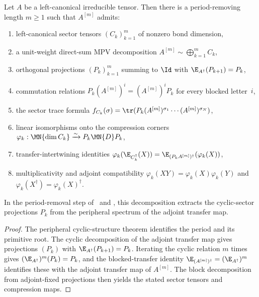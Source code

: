 \begin{lemma}%
    \label{thm:cyclic_sector_decomp_after_blocking}
    \leanok
    Let $A$ be a left-canonical irreducible tensor. Then there is a
    period-removing length $m\ge1$ such that $A^{[m]}$ admits:
    \begin{enumerate}
        \item left-canonical sector tensors $(C_k)_{k=1}^m$ of nonzero bond
              dimension,
        \item a unit-weight direct-sum MPV decomposition
              $A^{[m]}\sim\bigoplus_{k=1}^mC_k$,
        \item orthogonal projections $(P_k)_{k=1}^m$ summing to $\Id$ with
              $\E_{A^\dagger}(P_{k+1})=P_k$,
        \item commutation relations
              $P_k(A^{[m]})^i=(A^{[m]})^iP_k$ for every blocked letter~$i$,
        \item the sector trace formula
              $f_{C_k}(\sigma)
                  =\tr(P_k(A^{[m]})^{\sigma_1}\cdots(A^{[m]})^{\sigma_N})$,
        \item linear isomorphisms onto the compression corners
              $\varphi_k:\MN{\dim C_k}\xrightarrow{\sim}P_k\MN{D}P_k$,
        \item transfer-intertwining identities
              $\varphi_k(\E_{C_k^\dagger}(X))
                  =\E_{(P_kA^{[m]})^\dagger}(\varphi_k(X))$,
        \item multiplicativity and adjoint compatibility
              $\varphi_k(XY)=\varphi_k(X)\varphi_k(Y)$ and
              $\varphi_k(X^\dagger)=\varphi_k(X)^\dagger$.
    \end{enumerate}
    In the period-removal step of~\cite[Section~2.3]{Cirac2016MPDO_arXiv}
    and \cite[Theorem~6.6]{Wolf2012Quantum}, this decomposition extracts the
    cyclic-sector projections $P_k$ from the peripheral spectrum of the
    adjoint transfer map.
\end{lemma}

\begin{proof}\leanok
    The peripheral cyclic-structure theorem identifies the period and its
    primitive root. The cyclic decomposition of the adjoint transfer map gives
    projections $(P_k)$ with $\E_{A^\dagger}(P_{k+1})=P_k$. Iterating the cyclic relation
    $m$ times gives $(\E_{A^\dagger})^m(P_k)=P_k$, and the blocked-transfer
    identity
    $\E_{(A^{[m]})^\dagger}=(\E_{A^\dagger})^m$
    identifies these with the adjoint transfer map of $A^{[m]}$.
    The block decomposition from adjoint-fixed projections then yields the
    stated sector tensors and compression maps.
\end{proof}

